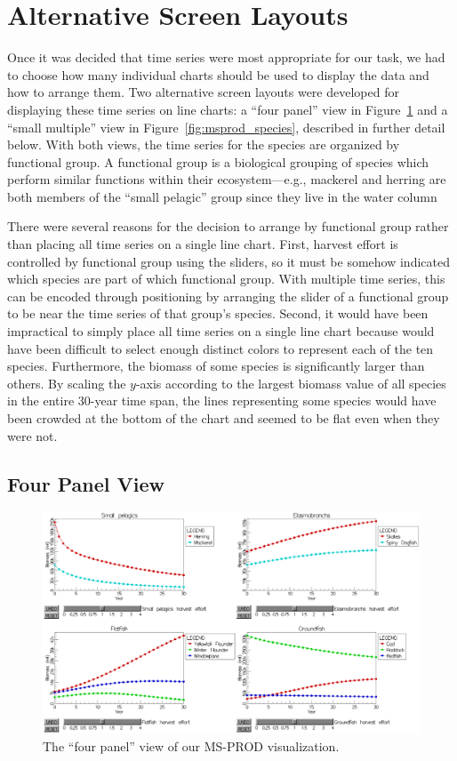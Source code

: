 \section{Alternative Screen Layouts}

Once it was decided that time series were most appropriate for our task, we had to choose how many individual charts should be used to display the data and how to arrange them.  Two alternative screen layouts were developed for displaying these time series on line charts: a ``four panel'' view in Figure~\ref{fig:msprod_group} and a ``small multiple'' view in Figure~\ref{fig:msprod_species}, described in further detail below.  With both views, the time series for the species are organized by functional group.  A functional group is a biological grouping of species which perform similar functions within their ecosystem---e.g., mackerel and herring are both members of the ``small pelagic'' group since they live in the water column

There were several reasons for the decision to arrange by functional group rather than placing all time series on a single line chart.  First, harvest effort is controlled by functional group using the sliders, so it must be somehow indicated which species are part of which functional group.  With multiple time series, this can be encoded through positioning by arranging the slider of a functional group to be near the time series of that group's species.  Second, it would have been impractical to simply place all time series on a single line chart because would have been difficult to select enough distinct colors to represent each of the ten species.  Furthermore, the biomass of some species is significantly larger than others.  By scaling the $y$-axis according to the largest biomass value of all species in the entire 30-year time span, the lines representing some species would have been crowded at the bottom of the chart and seemed to be flat even when they were not.

\subsection{Four Panel View}

\begin{figure}[h]
	\centering
	\includegraphics[width=14cm]{figures/eps/msprod_group.eps}
	\caption{The ``four panel'' view of our MS-PROD visualization.}
	\label{fig:msprod_group}
\end{figure}

